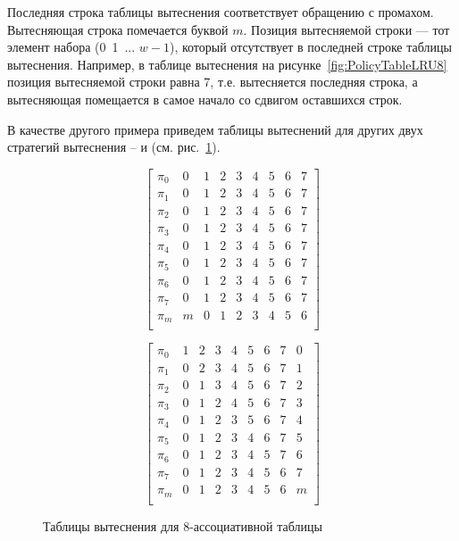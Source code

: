 Последняя строка таблицы вытеснения соответствует обращению с промахом.
Вытесняющая строка помечается буквой $m$. Позиция вытесняемой строки --- тот
элемент набора (0~1~... $w{-}1$), который отсутствует в последней строке таблицы
вытеснения. Например, в таблице вытеснения на рисунке~\ref{fig:PolicyTableLRU8}
позиция вытесняемой строки равна 7, т.е. вытесняется последняя строка, а
вытесняющая помещается в самое начало со сдвигом оставшихся строк.

В качестве другого примера приведем таблицы вытеснений для других двух стратегий
вытеснения -- \FIFO и \MRU (см. рис.~\ref{fig:fifo_mru_tables}).

\begin{figure}[h] \centering
\parbox{0.4\textwidth}{
$$ \left[
     \begin{array}{c|cccccccc}
       \pi_0 & 0 & 1 & 2 & 3 & 4 & 5 & 6 & 7 \\
       \pi_1 & 0 & 1 & 2 & 3 & 4 & 5 & 6 & 7 \\
       \pi_2 & 0 & 1 & 2 & 3 & 4 & 5 & 6 & 7 \\
       \pi_3 & 0 & 1 & 2 & 3 & 4 & 5 & 6 & 7 \\
       \pi_4 & 0 & 1 & 2 & 3 & 4 & 5 & 6 & 7 \\
       \pi_5 & 0 & 1 & 2 & 3 & 4 & 5 & 6 & 7 \\
       \pi_6 & 0 & 1 & 2 & 3 & 4 & 5 & 6 & 7 \\
       \pi_7 & 0 & 1 & 2 & 3 & 4 & 5 & 6 & 7 \\
       \pi_m & m & 0 & 1 & 2 & 3 & 4 & 5 & 6 \\
     \end{array}
   \right]$$
\center \FIFO} \qquad
\parbox{0.4\textwidth}{
$$ \left[
     \begin{array}{c|cccccccc}
       \pi_0 & 1 & 2 & 3 & 4 & 5 & 6 & 7 & 0 \\
       \pi_1 & 0 & 2 & 3 & 4 & 5 & 6 & 7 & 1 \\
       \pi_2 & 0 & 1 & 3 & 4 & 5 & 6 & 7 & 2 \\
       \pi_3 & 0 & 1 & 2 & 4 & 5 & 6 & 7 & 3 \\
       \pi_4 & 0 & 1 & 2 & 3 & 5 & 6 & 7 & 4 \\
       \pi_5 & 0 & 1 & 2 & 3 & 4 & 6 & 7 & 5 \\
       \pi_6 & 0 & 1 & 2 & 3 & 4 & 5 & 7 & 6 \\
       \pi_7 & 0 & 1 & 2 & 3 & 4 & 5 & 6 & 7 \\
       \pi_m & 0 & 1 & 2 & 3 & 4 & 5 & 6 & m \\
     \end{array}
   \right]$$
\center \MRU } \caption{Таблицы вытеснения для 8-ассоциативной
таблицы}\label{fig:fifo_mru_tables}
\end{figure}

